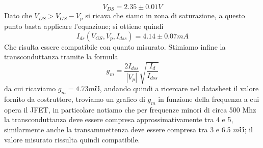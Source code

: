 \documentclass[10pt, a4paper, italian]{article}
\begin{document}
\[
V_{DS}=2.35 \pm 0.01 V
\]
Dato che $V_{DS} > V_{GS} - V_p$ si ricava che siamo in zona di saturazione, a questo punto basta applicare l'equazione; si ottiene quindi 
\[
I_{ds}(V_{GS},V_p,I_{dss})=4.14 \pm 0.07 mA
\]
Che risulta essere compatibile con quanto misurato.
Stimiamo infine la transconduttanza tramite la formula
\begin{equation}
g_m = \frac{2 I_{dss}}{|V_p|}\sqrt{\frac{I_{d}}{I_{dss}}}
\end{equation}
da cui ricaviamo $g_m = 4.73 \si{m\mho}$, andando quindi a ricercare nel datasheet il valore fornito da costruttore, troviamo un grafico di $g_m$ in funzione della frequenza a cui opera il JFET, in particolare notiamo che per frequenze minori di circa 500 Mhz la transconduttanza deve essere compresa approssimativamente tra 4 e 5, similarmente anche la transammettenza deve essere compresa tra 3 e 6.5 $\si{m\mho}$; il valore misurato rissulta quindi compatibile.
\end{document}
